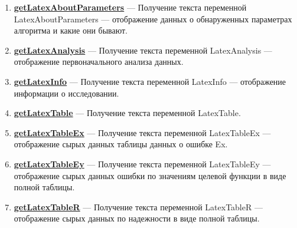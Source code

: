 \begin{enumerate}
\item \textbf{\hyperref[getLatexAboutParameters]{getLatexAboutParameters}} --- Получение текста переменной LatexAboutParameters --- отображение данных о обнаруженных параметрах алгоритма и какие они бывают.

\item \textbf{\hyperref[getLatexAnalysis]{getLatexAnalysis}} --- Получение текста переменной LatexAnalysis --- отображение первоначального анализа данных.

\item \textbf{\hyperref[getLatexInfo]{getLatexInfo}} --- Получение текста переменной LatexInfo --- отображение информации о исследовании.

\item \textbf{\hyperref[getLatexTable]{getLatexTable}} --- Получение текста переменной LatexTable.

\item \textbf{\hyperref[getLatexTableEx]{getLatexTableEx}} --- Получение текста переменной LatexTableEx --- отображение сырых данных таблицы данных о ошибке Ex.

\item \textbf{\hyperref[getLatexTableEy]{getLatexTableEy}} --- Получение текста переменной LatexTableEy --- отображение сырых данных ошибки по значениям целевой функции в виде полной таблицы.

\item \textbf{\hyperref[getLatexTableR]{getLatexTableR}} --- Получение текста переменной LatexTableR --- отображение сырых данных по надежности в виде полной таблицы.

\end{enumerate}

